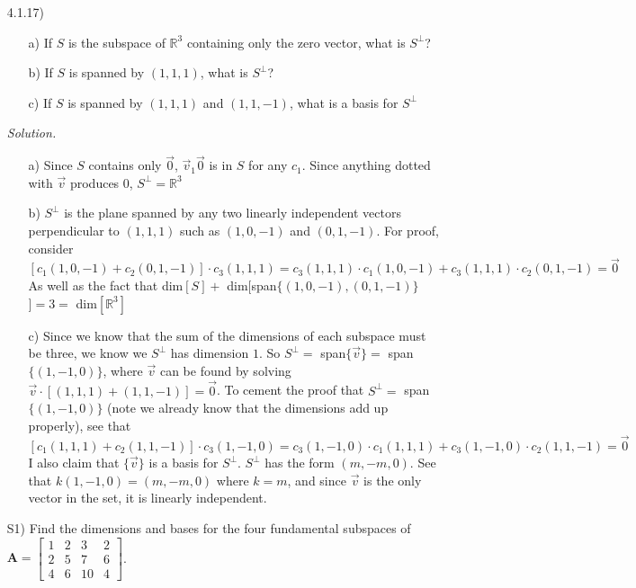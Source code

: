 \documentclass[12pt]{article}
\begin{document}
\begin{itemize}
\item[4.1.17)] 
\begin{itemize}
\item[a)] If $S$ is the subspace of $\mathbb{R}^3$ containing only the zero vector, what is $S^\perp$?
\item[b)] If $S$ is spanned by $(1,1,1)$, what is $S^\perp$?
\item[c)] If $S$ is spanned by $(1,1,1)$ and $(1,1,-1)$, what is a basis for $S^\perp$
\end{itemize}

\textit{Solution.}
\begin{itemize}
\item[a)] Since $S$ contains only $\vec{0}$, $\vec{v}_1\vec{0}$ is in $S$ for any $c_1$. Since anything dotted with $\vec{v}$ produces 0, $S^\perp = \mathbb{R}^3$
\item[b)] $S^\perp$ is the plane spanned by any two linearly independent vectors perpendicular to $(1,1,1)$ such as $(1,0,-1)$ and $(0,1,-1)$. For proof, consider \\
$[c_1(1,0,-1) + c_2(0,1,-1)] \cdot c_3(1,1,1)= c_3(1,1,1) \cdot c_1(1,0,-1) + c_3(1,1,1) \cdot c_2(0,1,-1)=\vec{0}$\\
As well as the fact that dim$[S] +$ dim$[$span$\{(1,0,-1),(0,1,-1)\}$ $]=3=$ dim$[\mathbb{R}^3]$ 
\item[c)] Since we know that the sum of the dimensions of each subspace must be three, we know we $S^\perp$ has dimension $1$. So $S^\perp =$ span$\{\vec{v}\}=$ span$\{(1,-1,0)\}$, where $\vec{v}$ can be found by solving
$\vec{v} \cdot [(1,1,1) + (1,1,-1)] = \vec{0}$. To cement the proof that $S^\perp =$ span$\{(1,-1,0)\}$ (note we already know that the dimensions add up properly), see that\\
$[c_1(1,1,1) + c_2(1,1,-1)] \cdot c_3(1,-1,0)= c_3(1,-1,0) \cdot c_1(1,1,1) + c_3(1,-1,0) \cdot c_2(1,1,-1)=\vec{0}$
I also claim that $\{\vec{v}\}$ is a basis for $S^\perp$. $S^\perp$ has the form $(m,-m,0)$. See that 
$k(1,-1,0)=(m,-m,0)$ where $k=m$, and since $\vec{v}$ is the only vector in the set, it is linearly independent.
\end{itemize}

\item[S1)] Find the dimensions and bases for the four fundamental subspaces of $\mathbf{A}=\left[\begin{array}{cccc} 1 & 2 & 3 & 2\\ 2 & 5 & 7 & 6\\ 4 & 6 & 10 &4\end{array}\right]$.  \\ 


\end{itemize}
\end{document}
